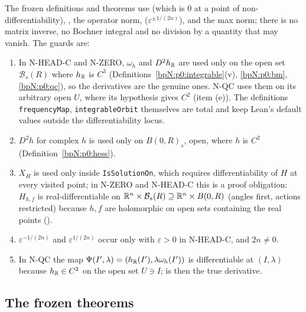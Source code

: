 \begin{remark}\label{bpN:p0:totality}
The frozen definitions and theorems use  (which is $0$ at a point of non-differentiability),
, the operator norm,  ($\varepsilon^{\pm1/(2n)}$),  and the max norm;
there is no matrix inverse, no Bochner integral and no division by a quantity that may vanish. The guards are:
\begin{enumerate}[label=(\alph*)]
\item In N-HEAD-C and N-ZERO, $\omega_h$ and $D^2h_{\mathbb{R}}$ are used only on the open set $\mathcal B_s(R)$ where $h_{\mathbb{R}}$
  is $C^3$ (Definitions~\ref{bpN:p0:integrable}(v), \ref{bpN:p0:bm}, \ref{bpN:p0:qc}), so the derivatives are the
  genuine ones. N-QC uses them on its arbitrary open $U$, where its hypothesis gives $C^2$ (item (e)). The
  definitions \texttt{frequencyMap}, \texttt{integrableOrbit} themselves are total and keep Lean's default
  values outside the differentiability locus.
\item $D^2h$ for complex $h$ is used only on $B(0,R)_s$, open, where $h$ is $C^2$ (Definition~\ref{bpN:p0:hess}).
\item $X_H$ is used only inside \texttt{IsSolutionOn}, which requires differentiability of $H$ at every visited point;
  in N-ZERO and N-HEAD-C this is a proof obligation: $H_{h,f}$ is real-differentiable on
  $\mathbb{R}^n\times\mathcal B_s(R)\supseteq\mathbb{R}^n\times B(0,R)$ (angles first, actions restricted) because $h,f$ are holomorphic on open sets containing the real
  points ().
\item $\varepsilon^{-1/(2n)}$ and $\varepsilon^{1/(2n)}$ occur only with $\varepsilon>0$ in N-HEAD-C, and $2n\ne0$.
\item In N-QC the map $\Psi(I',\lambda)=(h_{\mathbb{R}}(I'),\lambda\omega_h(I'))$ is differentiable at $(I,\lambda)$ because
  $h_{\mathbb{R}}\in C^2$ on the open set $U\ni I$;  is then the true derivative.
\end{enumerate}
\end{remark}

\subsection{The frozen theorems}\label{bpN:p0:theorems}

